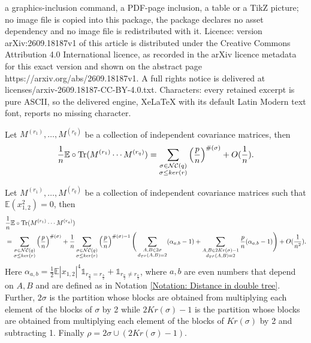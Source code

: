 \documentclass[10pt,a4paper]{amsart}
\newcommand{\E}{\mathbb{E}}
\newcommand{\I}{\mathds{1}}
\newcommand{\NC}{\mathcal{NC}}
\newcommand{\Tr}{\text{Tr}}
\begin{document}
a graphics-inclusion command, a PDF-page inclusion, a table or a TikZ picture; no image file is copied into this package, the package declares no asset dependency and no image file is redistributed with it. Licence: version arXiv:2609.18187v1 of this article is distributed under the Creative Commons Attribution 4.0 International licence, as recorded in the arXiv licence metadata for this exact version and shown on the abstract page https://arxiv.org/abs/2609.18187v1. A full rights notice is delivered at licenses/arxiv-2609.18187-CC-BY-4.0.txt. Characters: every retained excerpt is pure ASCII, so the delivered engine, XeLaTeX with its default Latin Modern text font, reports no missing character.
\begin{theorem}\label{Lemma: Expansion of moments 4}
Let $M^{(r_1)},\dots, M^{(r_q)}$ be a collection of independent covariance matrices, then
\begin{equation*}
\frac{1}{n}\E\circ \textup{\Tr}(M^{(r_1)}\cdots M^{(r_q)})=\sum_{\substack{\sigma\in \NC(q) \\ \sigma\leq ker(r)}}\left(\frac{p}{n}\right)^{\#(\sigma)}+O(\frac{1}{n}).
\end{equation*}
\end{theorem}

\begin{theorem}\label{Lemma: Expansion of moments 5}
Let $M^{(r_1)},\dots, M^{(r_q)}$ be a collection of independent covariance matrices such that $\E(x_{1,2}^2)=0$, then
\begin{align*}
&\frac{1}{n}\E\circ \textup{\Tr}(M^{(r_1)}\cdots M^{(r_q)})\\
&=\sum_{\substack{\sigma\in \NC(q) \\ \sigma\leq ker(r)}}\left(\frac{p}{n}\right)^{\#(\sigma)}+ 
\frac{1}{n}\sum_{\substack{\sigma\in \NC(q) \\ \sigma\leq ker(r)}}\left(\frac{p}{n}\right)^{\#(\sigma)-1}\Bigg(\sum_{\substack{A,B\in 2\sigma \\ d_{T^\rho}(A,B)=2}}(\alpha_{a,b}-1)+\sum_{\substack{A,B\in 2Kr(\sigma)-1 \\ d_{T^\rho}(A,B)=2}}\frac{p}{n}(\alpha_{a,b}-1)\Bigg) +O(\frac{1}{n^2}).
\end{align*}
Here $\alpha_{a,b}=\frac{1}{2}\E|x_{1,2}|^4 \I_{r_{\frac{a}{2}}=r_{\frac{b}{2}}}+\I_{r_{\frac{a}{2}}\neq r_{\frac{b}{2}}}$, where $a,b$ are even numbers that depend on $A,B$ and are defined as in Notation \ref{Notation: Distance in double tree}. Further, $2\sigma$ is the partition whose blocks are obtained from multiplying each element of the blocks of $\sigma$ by 2 while $2Kr(\sigma)-1$ is the partition whose blocks are obtained from multiplying each element of the blocks of $Kr(\sigma)$ by 2 and subtracting 1. Finally $\rho=2\sigma\cup (2Kr(\sigma)-1)$.
\end{theorem}
\end{document}
